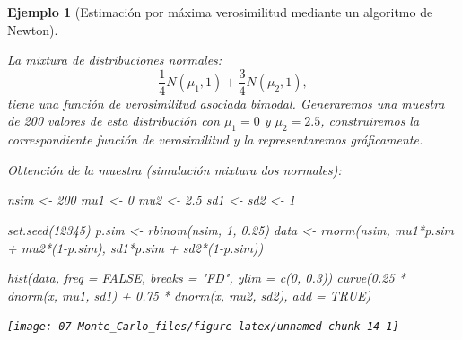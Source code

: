 \documentclass[
]{book}
\newenvironment{Shaded}{\begin{snugshade}}{\end{snugshade}}
\newcommand{\AttributeTok}[1]{\textcolor[rgb]{0.77,0.63,0.00}{#1}}
\newcommand{\ConstantTok}[1]{\textcolor[rgb]{0.00,0.00,0.00}{#1}}
\newcommand{\DecValTok}[1]{\textcolor[rgb]{0.00,0.00,0.81}{#1}}
\newcommand{\FloatTok}[1]{\textcolor[rgb]{0.00,0.00,0.81}{#1}}
\newcommand{\FunctionTok}[1]{\textcolor[rgb]{0.00,0.00,0.00}{#1}}
\newcommand{\NormalTok}[1]{#1}
\newcommand{\OtherTok}[1]{\textcolor[rgb]{0.56,0.35,0.01}{#1}}
\newcommand{\SpecialCharTok}[1]{\textcolor[rgb]{0.00,0.00,0.00}{#1}}
\newcommand{\StringTok}[1]{\textcolor[rgb]{0.31,0.60,0.02}{#1}}
\theoremstyle{break}
\newtheorem{example}{Ejemplo}[chapter]
\theoremstyle{nonumberplain}
\begin{document}
\begin{example}[Estimación por máxima verosimilitud mediante un algoritmo de Newton]
\protect\hypertarget{exm:mv-nlm}{}\label{exm:mv-nlm}

La mixtura de distribuciones normales:
\[\frac1{4}N(\mu_1,1)+\frac{3}{4}N(\mu_2,1),\]
tiene una función de verosimilitud asociada bimodal.
Generaremos una muestra de 200 valores de esta distribución con \(\mu_1=0\) y \(\mu_2=2.5\), construiremos la correspondiente función de verosimilitud y la representaremos gráficamente.

Obtención de la muestra (simulación mixtura dos normales):

\begin{Shaded}
\begin{Highlighting}[]
\NormalTok{nsim }\OtherTok{\textless{}{-}} \DecValTok{200}
\NormalTok{mu1 }\OtherTok{\textless{}{-}} \DecValTok{0} 
\NormalTok{mu2 }\OtherTok{\textless{}{-}} \FloatTok{2.5}
\NormalTok{sd1 }\OtherTok{\textless{}{-}}\NormalTok{ sd2 }\OtherTok{\textless{}{-}} \DecValTok{1}

\FunctionTok{set.seed}\NormalTok{(}\DecValTok{12345}\NormalTok{)}
\NormalTok{p.sim }\OtherTok{\textless{}{-}} \FunctionTok{rbinom}\NormalTok{(nsim, }\DecValTok{1}\NormalTok{, }\FloatTok{0.25}\NormalTok{)}
\NormalTok{data }\OtherTok{\textless{}{-}} \FunctionTok{rnorm}\NormalTok{(nsim, mu1}\SpecialCharTok{*}\NormalTok{p.sim }\SpecialCharTok{+}\NormalTok{ mu2}\SpecialCharTok{*}\NormalTok{(}\DecValTok{1}\SpecialCharTok{{-}}\NormalTok{p.sim), sd1}\SpecialCharTok{*}\NormalTok{p.sim }\SpecialCharTok{+}\NormalTok{ sd2}\SpecialCharTok{*}\NormalTok{(}\DecValTok{1}\SpecialCharTok{{-}}\NormalTok{p.sim))}

\FunctionTok{hist}\NormalTok{(data, }\AttributeTok{freq =} \ConstantTok{FALSE}\NormalTok{, }\AttributeTok{breaks =} \StringTok{"FD"}\NormalTok{, }\AttributeTok{ylim =} \FunctionTok{c}\NormalTok{(}\DecValTok{0}\NormalTok{, }\FloatTok{0.3}\NormalTok{))}
\FunctionTok{curve}\NormalTok{(}\FloatTok{0.25} \SpecialCharTok{*} \FunctionTok{dnorm}\NormalTok{(x, mu1, sd1) }\SpecialCharTok{+} \FloatTok{0.75} \SpecialCharTok{*} \FunctionTok{dnorm}\NormalTok{(x, mu2, sd2), }\AttributeTok{add =} \ConstantTok{TRUE}\NormalTok{)}
\end{Highlighting}
\end{Shaded}

\begin{center}\texttt{[image: 07-Monte\_Carlo\_files/figure-latex/unnamed-chunk-14-1]} \end{center}


\end{example}
\end{document}
